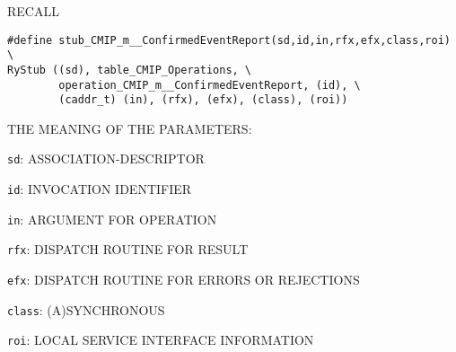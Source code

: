 \begin{bwslide}

\begin{nrtc}
\item	RECALL
{\small
\begin{verbatim}
#define stub_CMIP_m__ConfirmedEventReport(sd,id,in,rfx,efx,class,roi) \
RyStub ((sd), table_CMIP_Operations, \
        operation_CMIP_m__ConfirmedEventReport, (id), \
        (caddr_t) (in), (rfx), (efx), (class), (roi))
\end{verbatim}}

\item	THE MEANING OF THE PARAMETERS:
    \begin{nrtc}
    \item	\verb"sd": ASSOCIATION-DESCRIPTOR

    \item	\verb"id": INVOCATION IDENTIFIER

    \item	\verb"in": ARGUMENT FOR OPERATION

    \item	\verb"rfx": DISPATCH ROUTINE FOR RESULT

    \item	\verb"efx": DISPATCH ROUTINE FOR ERRORS OR REJECTIONS

    \item	\verb"class": (A)SYNCHRONOUS

    \item	\verb"roi": LOCAL SERVICE INTERFACE INFORMATION
    \end{nrtc}
\end{nrtc}
\end{bwslide}


